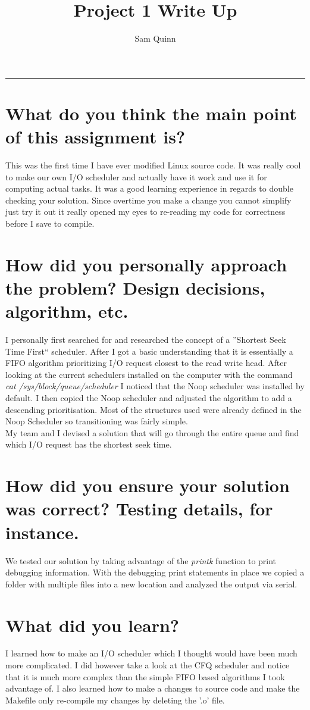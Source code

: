 \documentclass[letterpaper,10pt,notitlepage,fleqn]{article}
\title{Project 1 Write Up}
\author{Sam Quinn}
\begin{document}
\maketitle
\hrule

\section*{What do you think the main point of this assignment is?}
This was the first time I have ever modified Linux source code. It was really cool 
to make our own I/O scheduler and actually have it work and use it for computing 
actual tasks. It was a good learning experience in regards to  double checking 
your solution. Since overtime you make a change you cannot simplify just try it out 
it really opened my eyes to re-reading my code for correctness before I save to compile.
\section*{How did you personally approach the problem? Design decisions, algorithm, etc.}
I personally first searched for and researched the concept of a ''Shortest Seek Time First`` 
scheduler. After I got a basic understanding that it is essentially a FIFO algorithm 
prioritizing I/O request closest to the read write head. After looking at the current 
schedulers installed on the computer with the command \textit{cat /sys/block/queue/scheduler} 
I noticed that the Noop scheduler was installed by default. I then copied the Noop scheduler 
and adjusted the algorithm to add a descending prioritisation. Most of the structures used 
were already defined in the Noop Scheduler so transitioning was fairly simple. \\ My team 
and I devised a solution that will go through the entire queue and find which I/O request 
has the shortest seek time.
\section*{How did you ensure your solution was correct? Testing details, for instance.}
We tested our solution by taking advantage of the \textit{printk} function to print debugging 
information. With the debugging print statements in place we copied a folder with multiple files 
into a new location and analyzed the output via serial. 
\section*{What did you learn?}
I learned how to make an I/O scheduler which I thought would have been much more complicated. I did however take a look at the CFQ scheduler and notice that it is much more complex than the simple FIFO based algorithms I took advantage of. I also learned how to make a changes to source code and make the Makefile only re-compile my changes by deleting the '.o' file.
\end{document}
